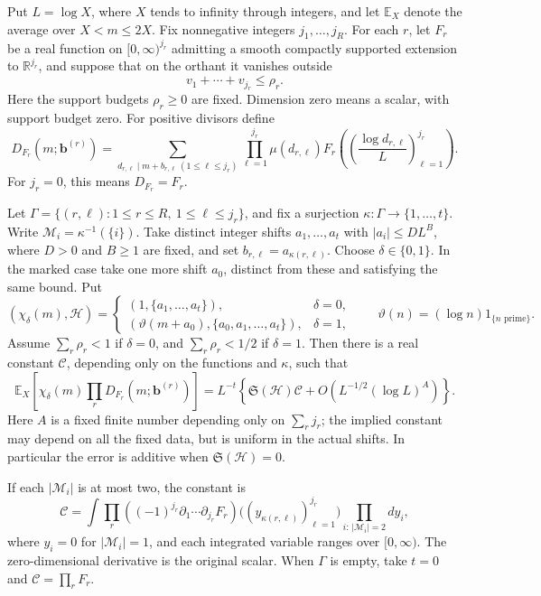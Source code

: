 \begin{proposition}\label{prop:mixed-moments}
Put $L=\log X$, where $X$ tends to infinity through integers, and let
$\mathbb E_X$ denote the average over $X<m\le2X$. Fix nonnegative integers
$j_1,\ldots,j_R$. For each $r$, let $F_r$ be a real function on
$[0,\infty)^{j_r}$ admitting a smooth compactly supported extension to
$\mathbb R^{j_r}$, and suppose that on the orthant it vanishes outside
\[
 v_1+\cdots+v_{j_r}\le\rho_r.
\]
Here the support budgets $\rho_r\ge0$ are fixed. Dimension zero means a scalar,
with support budget zero. For positive divisors
define
\[
 D_{F_r}(m;\mathbf b^{(r)})=
 \sum_{d_{r,\ell}\mid m+b_{r,\ell}\ (1\le\ell\le j_r)}
 \prod_{\ell=1}^{j_r}\mu(d_{r,\ell})
 F_r\left(\left(\frac{\log d_{r,\ell}}L\right)_{\ell=1}^{j_r}\right).
\]
For $j_r=0$, this means $D_{F_r}=F_r$.

Let $\Gamma=\{(r,\ell):1\le r\le R,\ 1\le\ell\le j_r\}$, and fix a
surjection $\kappa:\Gamma\to\{1,\ldots,t\}$. Write
$\mathcal M_i=\kappa^{-1}(\{i\})$. Take distinct integer shifts
$a_1,\ldots,a_t$ with $|a_i|\le DL^B$, where $D>0$ and $B\ge1$ are fixed,
and set $b_{r,\ell}=a_{\kappa(r,\ell)}$. Choose $\delta\in\{0,1\}$.
In the marked case take one more
shift $a_0$, distinct from these and satisfying the same bound. Put
\[
 (\chi_\delta(m),\mathcal H)=
 \begin{cases}
 (1,\{a_1,\ldots,a_t\}),&\delta=0,\\
 (\vartheta(m+a_0),\{a_0,a_1,\ldots,a_t\}),&\delta=1,
 \end{cases}
 \qquad \vartheta(n)=(\log n)1_{\{n\text{ prime}\}}.
\]
Assume $\sum_r\rho_r<1$ if $\delta=0$, and $\sum_r\rho_r<1/2$ if
$\delta=1$. Then there is a real constant $\mathcal C$, depending only on
the functions and $\kappa$, such that
\begin{equation}\label{eq:mixed-moment}
 \mathbb E_X\left[\chi_\delta(m)\prod_rD_{F_r}(m;\mathbf b^{(r)})\right]
 =L^{-t}\left\{\mathfrak S(\mathcal H)\mathcal C
 +O\!\left(L^{-1/2}(\log L)^A\right)\right\}.
\end{equation}
Here $A$ is a fixed finite number depending only on $\sum_rj_r$; the implied
constant may depend on all the fixed data, but is uniform in the actual
shifts. In particular the error is additive when $\mathfrak S(\mathcal H)=0$.

If each $|\mathcal M_i|$ is at most two, the constant is
\begin{equation}\label{eq:mixed-derivative-constant}
 \mathcal C=
 \int\prod_r\left((-1)^{j_r}\partial_1\cdots\partial_{j_r}F_r\right)
       \big((y_{\kappa(r,\ell)})_{\ell=1}^{j_r}\big)
       \prod_{i:\,|\mathcal M_i|=2}dy_i,
\end{equation}
where $y_i=0$ for $|\mathcal M_i|=1$, and each integrated variable ranges over
$[0,\infty)$. The zero-dimensional derivative is the original scalar.
When $\Gamma$ is empty, take $t=0$ and $\mathcal C=\prod_rF_r$.
\end{proposition}

